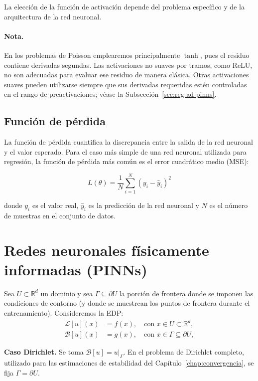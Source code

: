La elección de la función de activación depende del problema específico y de la arquitectura de la red neuronal.

\paragraph{Nota.} En los problemas de Poisson emplearemos principalmente $\tanh$, pues el residuo contiene derivadas segundas. Las activaciones no suaves por tramos, como ReLU, no son adecuadas para evaluar ese residuo de manera clásica. Otras activaciones suaves pueden utilizarse siempre que sus derivadas requeridas estén controladas en el rango de preactivaciones; véase la Subsección~\ref{sec:reg-ad-pinns}.


\subsection{Función de pérdida}

La función de pérdida cuantifica la discrepancia entre la salida de la red neuronal y el valor esperado. Para el caso más simple de una red neuronal utilizada para regresión, la función de pérdida más común es el error cuadrático medio (MSE):

\[
L(\theta) = \frac{1}{N} \sum_{i=1}^{N} (y_i - \hat{y}_i)^2
\]

donde \(y_i\) es el valor real, \(\hat{y}_i\) es la predicción de la red neuronal y \(N\) es el número de muestras en el conjunto de datos.


\section{Redes neuronales físicamente informadas (PINNs)}

Sea $U\subset\mathbb{R}^d$ un dominio y sea $\Gamma\subseteq\partial U$ la porción de frontera donde se imponen las condiciones de contorno (y donde se muestrean los puntos de frontera durante el entrenamiento).
Consideremos la EDP:
\begin{align*}
    \mathcal{L}[u](x) &= f(x), \quad \text{con } x \in U \subset \mathbb{R}^{d}, \\
    \mathcal{B}[u](x) &= g(x), \quad \text{con } x \in \Gamma \subseteq \partial U,
\end{align*}

\noindent\textbf{Caso Dirichlet.} Se toma $\mathcal{B}[u]=u|_{\Gamma}$. En el problema de Dirichlet completo, utilizado para las estimaciones de estabilidad del Capítulo~\ref{chap:convergencia}, se fija $\Gamma=\partial U$.


